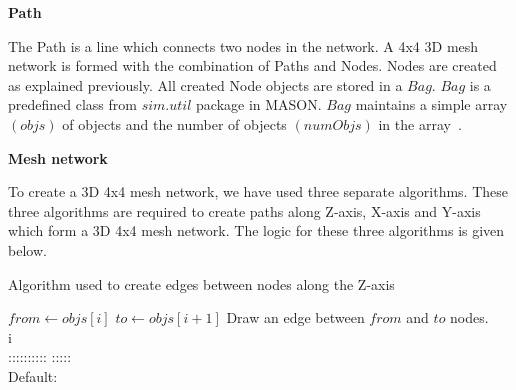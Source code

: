  
\vspace{0.5cm}
\noindent\textbf{Path}
\vspace{5mm}

\noindent The Path is a line which connects two nodes in the network. A 4x4 3D mesh network is formed with the combination of Paths and Nodes. Nodes are created as explained previously. All created Node objects are stored in a $Bag$. $Bag$ is a predefined class from $sim.util$ package in MASON. $Bag$ maintains a simple array $(objs)$ of objects and the number of objects $(numObjs)$ in the array~\cite{Bag}.

\vspace{0.5cm}
\noindent\textbf{Mesh network}
\vspace{5mm}

To create a 3D 4x4 mesh network, we have used three separate algorithms. These three algorithms are required to create paths along Z-axis, X-axis and Y-axis which form a 3D 4x4 mesh network. The logic for these three algorithms is given below.

\vspace{10mm}
\begin{algorithm}[H]
\small %
\caption{Algorithm used to create edges between nodes along the Z-axis}
\label{alg4}
\begin{boxedminipage}{150mm}
\vspace{5mm}
\begin{algorithmic}[1]
\State $from \gets objs[i]$
\State $to \gets objs[i+1]$
\State Draw an edge between $from$ and $to$ nodes.
 \\
\SWITCH i \\        
 :::::::::: :::::  
  \\
 \CASE Default: 
\EndIf
\EndFor
\end{algorithmic}
\vspace{5mm}
\end{boxedminipage}
\end{algorithm}



